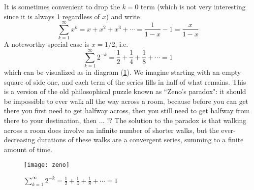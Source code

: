 It is sometimes convenient to drop the $k=0$ term (which is not very interesting since it is always 1 regardless of $x$) and write
\[
\sum_{k=1}^{\infty} x^k = x + x^2 + x^3 +\cdots = \frac{1}{1-x} - 1 = \frac{x}{1-x}
\]
A noteworthy  special case is $x=1/2$, i.e.
\begin{equation}\label{eq:Zeno}
\sum_{k=1}^{\infty} 2^{-k} = \frac{1}{2} + \frac{1}{4} + \frac{1}{8} + \cdots =1
\end{equation}
which can be visualized as in diagram (\ref{fig:zeno}).
We imagine starting with an empty square of side one, and each term of the series fills in half of what remains. This is a version of the old philosophical puzzle known as ``Zeno's paradox": it should be impossible to ever walk all the way across a room, because before you can get there you first need to get halfway across, then you still need to get halfway from there to your destination, then ... !? The solution to the paradox is that walking across a room does involve an infinite number of shorter walks, but the ever-decreasing durations of these walks are a convergent series, summing to a finite amount of time.
\begin{figure}
\begin{center}
\texttt{[image: zeno]}
\end{center}
\caption{$\sum_{k=1}^{\infty} 2^{-k} = \frac{1}{2} + \frac{1}{4} + \frac{1}{8} + \cdots =1$\label{fig:zeno}}
\end{figure}

